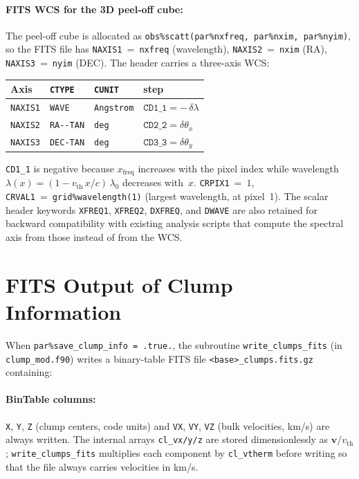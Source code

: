 \documentclass[english,a4paper]{my_memo}
\begin{document}
\paragraph{FITS WCS for the 3D peel-off cube:}
The peel-off cube is allocated as
\texttt{obs\%scatt(par\%nxfreq, par\%nxim, par\%nyim)}, so the FITS file
has \texttt{NAXIS1}~=~\texttt{nxfreq} (wavelength), \texttt{NAXIS2}~=~\texttt{nxim}
(RA), \texttt{NAXIS3}~=~\texttt{nyim} (DEC).  The header carries a
three-axis WCS:
\begin{center}
\begin{tabular}{l|lll}
\hline
Axis & \texttt{CTYPE} & \texttt{CUNIT} & step \\
\hline
\texttt{NAXIS1} & \texttt{WAVE}    & \texttt{Angstrom} & $\texttt{CD1\_1} = -\,\delta\lambda$ \\
\texttt{NAXIS2} & \texttt{RA-{}-TAN} & \texttt{deg}    & $\texttt{CD2\_2} = \delta\theta_x$ \\
\texttt{NAXIS3} & \texttt{DEC-TAN} & \texttt{deg}      & $\texttt{CD3\_3} = \delta\theta_y$ \\
\hline
\end{tabular}
\end{center}
\texttt{CD1\_1} is negative because $x_\mathrm{freq}$ increases with the
pixel index while wavelength
$\lambda(x) = (1 - v_\mathrm{th}\,x/c)\,\lambda_0$ decreases with~$x$.
\texttt{CRPIX1}~=~$1$, \texttt{CRVAL1}~=~\texttt{grid\%wavelength(1)}
(largest wavelength, at pixel~1).  The scalar header keywords
\texttt{XFREQ1}, \texttt{XFREQ2}, \texttt{DXFREQ}, and \texttt{DWAVE} are
also retained for backward compatibility with existing analysis scripts
that compute the spectral axis from those instead of from the WCS.

\section{FITS Output of Clump Information}
\label{sec:clump_fits}

\begin{sloppypar}
When \texttt{par\%save\_clump\_info = .true.}, the subroutine
\texttt{write\_clumps\_fits} (in \texttt{clump\_mod.f90}) writes a binary-table
FITS file \texttt{<base>\_clumps.fits.gz} containing:
\end{sloppypar}

\paragraph{BinTable columns:}
\texttt{X}, \texttt{Y}, \texttt{Z} (clump centers, code units) and
\texttt{VX}, \texttt{VY}, \texttt{VZ} (bulk velocities, km/s) are always
written.  The internal arrays \texttt{cl\_vx/y/z} are stored
dimensionlessly as $\boldsymbol{v}/v_\mathrm{th}$;
\texttt{write\_clumps\_fits} multiplies each component by
\texttt{cl\_vtherm} before writing so that the file always carries
velocities in km/s.
\end{document}
